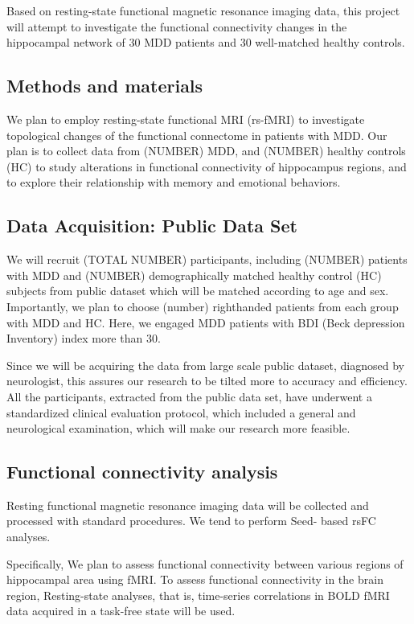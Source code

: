 \documentclass{article}
\begin{document}
Based on resting-state functional magnetic resonance imaging data,
this project will attempt to investigate the functional connectivity
changes in the hippocampal network of 30 MDD patients and 30
well-matched healthy controls.

\subsection{Methods and materials}

We plan to employ resting-state functional MRI (rs-fMRI) to
investigate topological changes of the functional connectome in
patients with MDD. Our plan is to collect data from (NUMBER) MDD, and
(NUMBER) healthy controls (HC) to study alterations in functional
connectivity of hippocampus regions, and to explore their relationship
with memory and emotional behaviors.

\subsection{Data Acquisition: Public Data Set}

We will recruit (TOTAL NUMBER) participants, including (NUMBER)
patients with MDD and (NUMBER) demographically matched healthy control
(HC) subjects from public dataset which will be matched according to
age and sex.  Importantly, we plan to choose (number) righthanded
patients from each group with MDD and HC. Here, we engaged MDD
patients with BDI (Beck depression Inventory) index more than 30.

Since we will be acquiring the data from large scale public dataset,
diagnosed by neurologist, this assures our research to be tilted more
to accuracy and efficiency.  All the participants, extracted from the
public data set, have underwent a standardized clinical evaluation
protocol, which included a general and neurological examination, which
will make our research more feasible.

\subsection{Functional connectivity analysis}

Resting functional magnetic resonance imaging data will be collected
and processed with standard procedures. We tend to perform Seed- based
rsFC analyses.

Specifically, We plan to assess functional connectivity between
various regions of hippocampal area using fMRI. To assess functional
connectivity in the brain region, Resting-state analyses, that is,
time-series correlations in BOLD fMRI data acquired in a task-free
state will be used.
\end{document}
